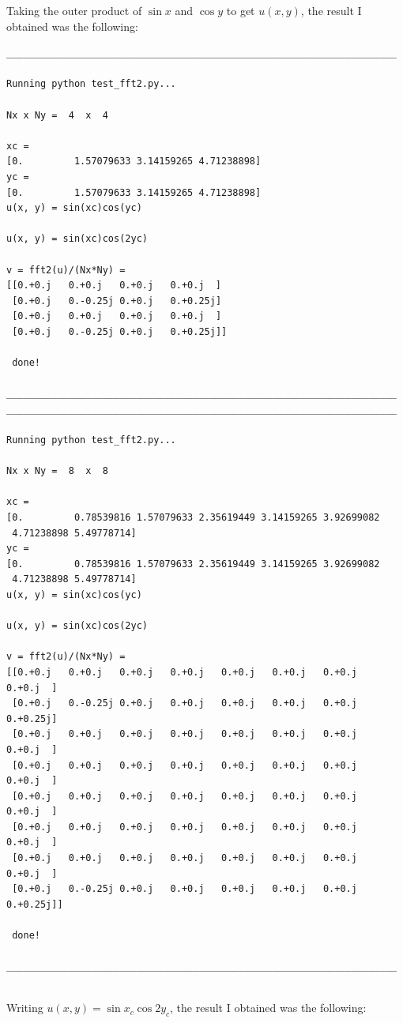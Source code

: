 \documentclass{article}
\begin{document}
Taking the outer product of $\sin {x}$ and $\cos{y}$ to get $u(x, y)$, the result I obtained was the following:
\begin{verbatim}
_____________________________________________________________________

Running python test_fft2.py... 

Nx x Ny =  4  x  4 

xc = 
[0.         1.57079633 3.14159265 4.71238898]
yc = 
[0.         1.57079633 3.14159265 4.71238898]
u(x, y) = sin(xc)cos(yc) 

u(x, y) = sin(xc)cos(2yc) 

v = fft2(u)/(Nx*Ny) = 
[[0.+0.j   0.+0.j   0.+0.j   0.+0.j  ]
 [0.+0.j   0.-0.25j 0.+0.j   0.+0.25j]
 [0.+0.j   0.+0.j   0.+0.j   0.+0.j  ]
 [0.+0.j   0.-0.25j 0.+0.j   0.+0.25j]]

 done!

_____________________________________________________________________
_____________________________________________________________________

Running python test_fft2.py... 

Nx x Ny =  8  x  8 

xc = 
[0.         0.78539816 1.57079633 2.35619449 3.14159265 3.92699082
 4.71238898 5.49778714]
yc = 
[0.         0.78539816 1.57079633 2.35619449 3.14159265 3.92699082
 4.71238898 5.49778714]
u(x, y) = sin(xc)cos(yc) 

u(x, y) = sin(xc)cos(2yc) 

v = fft2(u)/(Nx*Ny) = 
[[0.+0.j   0.+0.j   0.+0.j   0.+0.j   0.+0.j   0.+0.j   0.+0.j   0.+0.j  ]
 [0.+0.j   0.-0.25j 0.+0.j   0.+0.j   0.+0.j   0.+0.j   0.+0.j   0.+0.25j]
 [0.+0.j   0.+0.j   0.+0.j   0.+0.j   0.+0.j   0.+0.j   0.+0.j   0.+0.j  ]
 [0.+0.j   0.+0.j   0.+0.j   0.+0.j   0.+0.j   0.+0.j   0.+0.j   0.+0.j  ]
 [0.+0.j   0.+0.j   0.+0.j   0.+0.j   0.+0.j   0.+0.j   0.+0.j   0.+0.j  ]
 [0.+0.j   0.+0.j   0.+0.j   0.+0.j   0.+0.j   0.+0.j   0.+0.j   0.+0.j  ]
 [0.+0.j   0.+0.j   0.+0.j   0.+0.j   0.+0.j   0.+0.j   0.+0.j   0.+0.j  ]
 [0.+0.j   0.-0.25j 0.+0.j   0.+0.j   0.+0.j   0.+0.j   0.+0.j   0.+0.25j]]

 done!

_____________________________________________________________________


\end{verbatim}

Writing $u(x, y) = \sin{x_{c}}\cos{2y_{c}}$, the result I obtained was the following:
\end{document}
